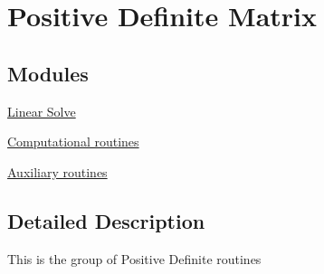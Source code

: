 \hypertarget{group__PO}{}\section{Positive Definite Matrix}
\label{group__PO}
\subsection*{Modules}
\begin{DoxyCompactItemize}
\item 
\hyperlink{group__solvePO}{Linear Solve}
\item 
\hyperlink{group__computationalPO}{Computational routines}
\item 
\hyperlink{group__auxiliaryPO}{Auxiliary routines}
\end{DoxyCompactItemize}


\subsection{Detailed Description}
This is the group of Positive Definite routines 